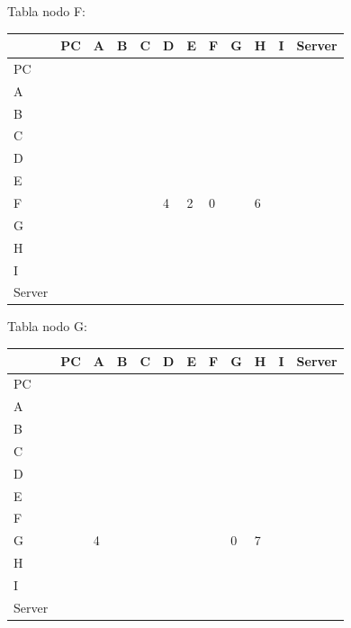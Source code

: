 \documentclass[a4paper]{article}
\begin{document}
\begin{table}[ht]
Tabla nodo F:\\
\begin{tabular}{|l|l|l|l|l|l|l|l|l|l|l|l|}
\hline
       & PC & A & B & C & D & E & F & G & H & I & Server \\ \hline
PC     &    &   &   &   &   &   &   &   &   &   &        \\ \hline
A      &    &   &   &   &   &   &   &   &   &   &        \\ \hline
B      &    &   &   &   &   &   &   &   &   &   &        \\ \hline
C      &    &   &   &   &   &   &   &   &   &   &        \\ \hline
D      &    &   &   &   &   &   &   &   &   &   &        \\ \hline
E      &    &   &   &   &   &   &   &   &   &   &        \\ \hline
F      &    &   &   &   & 4 & 2 & 0 &   & 6 &   &        \\ \hline
G      &    &   &   &   &   &   &   &   &   &   &        \\ \hline
H      &    &   &   &   &   &   &   &   &   &   &        \\ \hline
I      &    &   &   &   &   &   &   &   &   &   &        \\ \hline
Server &    &   &   &   &   &   &   &   &   &   &        \\ \hline
\end{tabular}
\end{table}



\begin{table}[ht]
Tabla nodo G:\\
\begin{tabular}{|l|l|l|l|l|l|l|l|l|l|l|l|}
\hline
       & PC & A & B & C & D & E & F & G & H & I & Server \\ \hline
PC     &    &   &   &   &   &   &   &   &   &   &        \\ \hline
A      &    &   &   &   &   &   &   &   &   &   &        \\ \hline
B      &    &   &   &   &   &   &   &   &   &   &        \\ \hline
C      &    &   &   &   &   &   &   &   &   &   &        \\ \hline
D      &    &   &   &   &   &   &   &   &   &   &        \\ \hline
E      &    &   &   &   &   &   &   &   &   &   &        \\ \hline
F      &    &   &   &   &   &   &   &   &   &   &        \\ \hline
G      &    & 4 &   &   &   &   &   & 0 & 7 &   &        \\ \hline
H      &    &   &   &   &   &   &   &   &   &   &        \\ \hline
I      &    &   &   &   &   &   &   &   &   &   &        \\ \hline
Server &    &   &   &   &   &   &   &   &   &   &        \\ \hline
\end{tabular}
\end{table}
\end{document}
